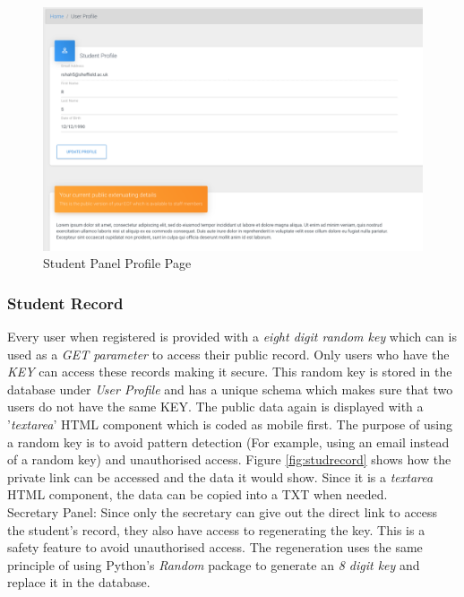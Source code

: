 \documentclass[../main.tex]{subfiles}
\begin{document}
\begin{figure}[H]
        \includegraphics[scale=0.7]
        {images/profile.png}
        \caption{\label{fig:profile} Student Panel Profile Page}
      \end{figure}

\subsubsection{Student Record} 
Every user when registered is provided with a\textit{ eight digit random key} which can is used as a \textit{GET parameter} to access their public record. Only users who have the \textit{KEY} can access these records making it secure. This random key is stored in the database under \textit{User Profile} and has a unique schema which makes sure that two users do not have the same KEY. The public data again is displayed with a '\textit{textarea}' HTML component which is coded as mobile first. The purpose of using a random key is to avoid pattern detection (For example, using an email instead of a random key) and unauthorised access. Figure \ref{fig:studrecord} shows how the private link can be accessed and the data it would show. Since it is a \textit{textarea} HTML component, the data can be copied into a TXT when needed. \\[4mm]

Secretary Panel: Since only the secretary can give out the direct link to access the student's record, they also have access to regenerating the key. This is a safety feature to avoid unauthorised access. The regeneration uses the same principle of using Python's \textit{Random} package to generate an \textit{8 digit key} and replace it in the database. 
\end{document}

